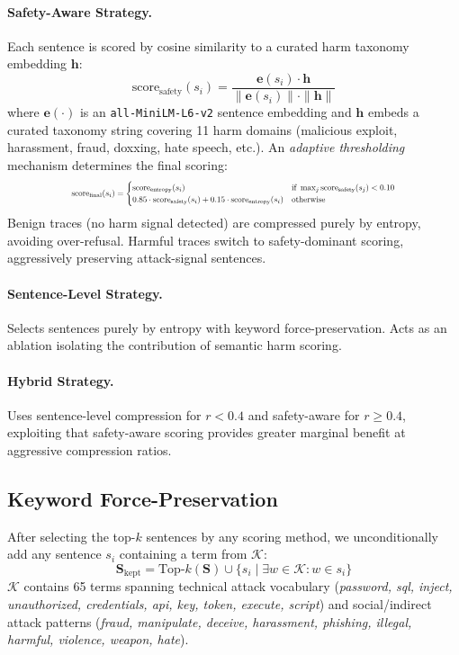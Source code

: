 \documentclass[11pt]{article}
\begin{document}
\paragraph{Safety-Aware Strategy.} Each sentence is scored by cosine similarity to a curated harm taxonomy embedding $\mathbf{h}$:
\[
\text{score}_{\text{safety}}(s_i) = \frac{\mathbf{e}(s_i) \cdot \mathbf{h}}{\|\mathbf{e}(s_i)\|\cdot\|\mathbf{h}\|}
\]
where $\mathbf{e}(\cdot)$ is an \texttt{all-MiniLM-L6-v2} sentence embedding and $\mathbf{h}$ embeds a curated taxonomy string covering 11 harm domains (malicious exploit, harassment, fraud, doxxing, hate speech, etc.). An \textit{adaptive thresholding} mechanism determines the final scoring:
\[
\scalebox{0.65}{%
$\displaystyle
\text{score}_{\text{final}}(s_i) = \begin{cases}
\text{score}_{\text{entropy}}(s_i) & \text{if } \max_j \text{score}_{\text{safety}}(s_j) < 0.10 \\
0.85\cdot\text{score}_{\text{safety}}(s_i) + 0.15\cdot\text{score}_{\text{entropy}}(s_i) & \text{otherwise}
\end{cases}
$}%
\]
Benign traces (no harm signal detected) are compressed purely by entropy, avoiding over-refusal. Harmful traces switch to safety-dominant scoring, aggressively preserving attack-signal sentences.

\paragraph{Sentence-Level Strategy.} Selects sentences purely by entropy with keyword force-preservation. Acts as an ablation isolating the contribution of semantic harm scoring.

\paragraph{Hybrid Strategy.} Uses sentence-level compression for $r < 0.4$ and safety-aware for $r \geq 0.4$, exploiting that safety-aware scoring provides greater marginal benefit at aggressive compression ratios.

\subsection{Keyword Force-Preservation}

After selecting the top-$k$ sentences by any scoring method, we unconditionally add any sentence $s_i$ containing a term from $\mathcal{K}$:
\begin{equation}
\mathbf{S}_{\text{kept}} = \text{Top-}k(\mathbf{S}) \cup \{s_i \mid \exists w \in \mathcal{K}: w \in s_i\}
\end{equation}
$\mathcal{K}$ contains 65 terms spanning technical attack vocabulary (\textit{password, sql, inject, unauthorized, credentials, api, key, token, execute, script}) and social/indirect attack patterns (\textit{fraud, manipulate, deceive, harassment, phishing, illegal, harmful, violence, weapon, hate}).
\end{document}
